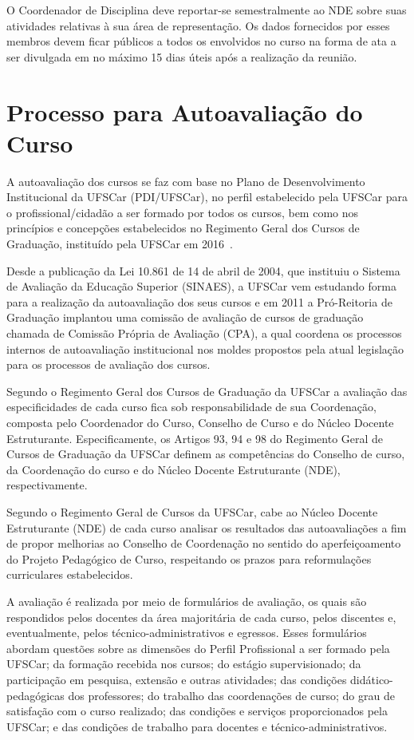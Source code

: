 O Coordenador de Disciplina deve reportar-se semestralmente ao NDE sobre suas atividades relativas à sua área de representação. Os dados fornecidos por esses membros devem ficar públicos a todos os envolvidos no curso na forma de ata a ser divulgada em no máximo 15 dias úteis após a realização da reunião.


\section{Processo para Autoavaliação do Curso}

A autoavaliação dos cursos se faz com base no Plano de Desenvolvimento Institucional da UFSCar (PDI/UFSCar), no perfil estabelecido pela UFSCar para o profissional/cidadão a ser formado por todos os cursos, bem como nos princípios e concepções estabelecidos no Regimento Geral dos Cursos de Graduação, instituído pela UFSCar em 2016~\cite{RGCG}.

Desde a publicação da Lei 10.861 de 14 de abril de 2004, que instituiu o Sistema de Avaliação da Educação Superior (SINAES), a UFSCar vem estudando forma para a realização da autoavaliação dos seus cursos e em 2011 a Pró-Reitoria de Graduação implantou uma comissão de avaliação de cursos de graduação chamada de Comissão Própria de Avaliação (CPA), a qual coordena os processos internos de autoavaliação institucional nos moldes propostos pela atual legislação para os processos de avaliação dos cursos.

Segundo o Regimento Geral dos Cursos de Graduação da UFSCar a avaliação das especificidades de cada curso fica sob responsabilidade de sua Coordenação, composta pelo Coordenador do Curso, Conselho de Curso e do Núcleo Docente Estruturante. Especificamente, os Artigos 93, 94 e 98 do Regimento Geral de Cursos de Graduação da UFSCar definem as competências do Conselho de curso, da Coordenação do curso e do Núcleo Docente Estruturante (NDE), respectivamente.

Segundo o Regimento Geral de Cursos da UFSCar, cabe ao Núcleo Docente Estruturante (NDE) de cada curso analisar os resultados das autoavaliações a fim de propor melhorias ao Conselho de Coordenação no sentido do aperfeiçoamento do Projeto Pedagógico de Curso, respeitando os prazos para reformulações curriculares estabelecidos.

A avaliação é realizada por meio de formulários de avaliação, os quais são respondidos pelos docentes da área majoritária de cada curso, pelos discentes e, eventualmente, pelos técnico-administrativos e egressos. Esses formulários abordam questões sobre as dimensões do Perfil Profissional a ser formado pela UFSCar; da formação recebida nos cursos; do estágio supervisionado; da participação em pesquisa, extensão e outras atividades; das condições didático-pedagógicas dos professores; do trabalho das coordenações de curso; do grau de satisfação com o curso realizado; das condições e serviços proporcionados pela UFSCar; e das condições de trabalho para docentes e técnico-administrativos.

